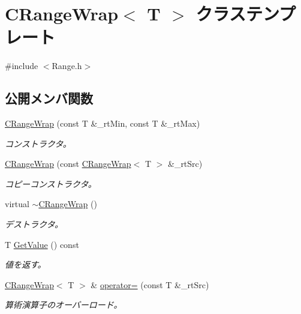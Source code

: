 \hypertarget{class_c_range_wrap}{}\section{C\+Range\+Wrap$<$ T $>$ クラステンプレート}
\label{class_c_range_wrap}


{\ttfamily \#include $<$Range.\+h$>$}

\subsection*{公開メンバ関数}
\begin{DoxyCompactItemize}
\item 
\hyperlink{class_c_range_wrap_a361e013df71ae542c8125dc448556120}{C\+Range\+Wrap} (const T \&\+\_\+rt\+Min, const T \&\+\_\+rt\+Max)
\begin{DoxyCompactList}\small\item\em コンストラクタ。 \end{DoxyCompactList}\item 
\hyperlink{class_c_range_wrap_a637a244ef7bc5f1eee6c6bb801e7da57}{C\+Range\+Wrap} (const \hyperlink{class_c_range_wrap}{C\+Range\+Wrap}$<$ T $>$ \&\+\_\+rt\+Src)
\begin{DoxyCompactList}\small\item\em コピーコンストラクタ。 \end{DoxyCompactList}\item 
virtual \hyperlink{class_c_range_wrap_a087e40fb38d3163d7227f8e411fc1b93}{$\sim$\+C\+Range\+Wrap} ()
\begin{DoxyCompactList}\small\item\em デストラクタ。 \end{DoxyCompactList}\item 
T \hyperlink{class_c_range_wrap_a24280495a8dd02bdf7b2a789d2e20133}{Get\+Value} () const 
\begin{DoxyCompactList}\small\item\em 値を返す。 \end{DoxyCompactList}\item 
\hyperlink{class_c_range_wrap}{C\+Range\+Wrap}$<$ T $>$ \& \hyperlink{class_c_range_wrap_a802756ac3f31b43eff05ddef00aa0795}{operator=} (const T \&\+\_\+rt\+Src)
\begin{DoxyCompactList}\small\item\em 算術演算子のオーバーロード。 \end{DoxyCompactList}\item 

\end{DoxyCompactItemize}
